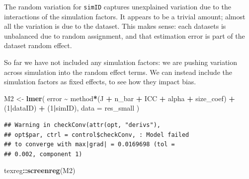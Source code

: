\documentclass[
]{book}
\newenvironment{Shaded}{\begin{snugshade}}{\end{snugshade}}
\newcommand{\AttributeTok}[1]{\textcolor[rgb]{0.13,0.29,0.53}{#1}}
\newcommand{\DecValTok}[1]{\textcolor[rgb]{0.00,0.00,0.81}{#1}}
\newcommand{\FunctionTok}[1]{\textcolor[rgb]{0.13,0.29,0.53}{\textbf{#1}}}
\newcommand{\NormalTok}[1]{#1}
\newcommand{\OtherTok}[1]{\textcolor[rgb]{0.56,0.35,0.01}{#1}}
\newcommand{\SpecialCharTok}[1]{\textcolor[rgb]{0.81,0.36,0.00}{\textbf{#1}}}
\begin{document}
The random variation for \texttt{simID} captures unexplained variation due to the interactions of the simulation factors.
It appears to be a trivial amount; almost all the variation is due to the dataset.
This makes sense: each datasets is unbalanced due to random assignment, and that estimation error is part of the dataset random effect.

So far we have not included any simulation factors: we are pushing variation across simulation into the random effect terms. We can instead include the simulation factors as fixed effects, to see how they impact bias.

\begin{Shaded}
\begin{Highlighting}[]
\NormalTok{M2 }\OtherTok{\textless{}{-}} \FunctionTok{lmer}\NormalTok{( }
\NormalTok{  error }\SpecialCharTok{\textasciitilde{}}\NormalTok{ method}\SpecialCharTok{*}\NormalTok{(J }\SpecialCharTok{+}\NormalTok{ n\_bar }\SpecialCharTok{+}\NormalTok{ ICC }\SpecialCharTok{+}\NormalTok{ alpha }\SpecialCharTok{+}\NormalTok{ size\_coef) }\SpecialCharTok{+}\NormalTok{ (}\DecValTok{1}\SpecialCharTok{|}\NormalTok{dataID) }\SpecialCharTok{+}\NormalTok{ (}\DecValTok{1}\SpecialCharTok{|}\NormalTok{simID),}
  \AttributeTok{data =}\NormalTok{ res\_small }
\NormalTok{)}
\end{Highlighting}
\end{Shaded}

\begin{verbatim}
## Warning in checkConv(attr(opt, "derivs"),
## opt$par, ctrl = control$checkConv, : Model failed
## to converge with max|grad| = 0.0169698 (tol =
## 0.002, component 1)
\end{verbatim}

\begin{Shaded}
\begin{Highlighting}[]
\NormalTok{texreg}\SpecialCharTok{::}\FunctionTok{screenreg}\NormalTok{(M2)}
\end{Highlighting}
\end{Shaded}
\end{document}
